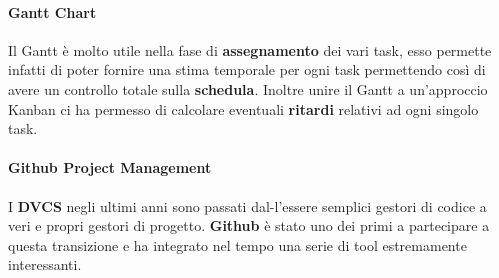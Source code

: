 \paragraph{Gantt Chart}
Il Gantt è molto utile nella fase di \textbf{assegnamento} dei vari task, esso permette infatti di poter fornire una stima temporale per ogni task permettendo così di avere un controllo totale sulla \textbf{schedula}. Inoltre unire il Gantt a un'approccio Kanban ci ha permesso di calcolare eventuali \textbf{ritardi} relativi ad ogni singolo task.

\paragraph{Github Project Management}
I \textbf{DVCS} negli ultimi anni sono passati dal-l'essere semplici gestori di codice a veri e propri gestori di progetto. \textbf{Github} è stato uno dei primi a partecipare a questa transizione e ha integrato nel tempo una serie di tool estremamente interessanti.
